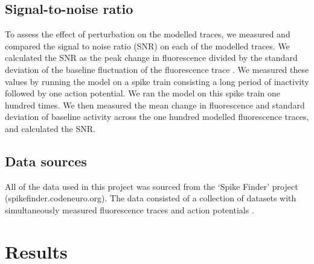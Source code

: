\subsection{Signal-to-noise ratio}\label{sec:snr}
To assess the effect of perturbation on the modelled traces, we measured and compared the signal to noise ratio (SNR) on each of the modelled traces. We calculated the SNR as the peak change in fluorescence divided by the standard deviation of the baseline fluctuation of the fluorescence trace  \parencite{tada}. We measured these values by running the model on a spike train consisting a long period of inactivity followed by one action potential. We ran the model on this spike train one hundred times. We then measured the mean change in fluorescence and standard deviation of baseline activity across the one hundred modelled fluorescence traces, and calculated the SNR.

\subsection{Data sources}
All of the data used in this project was sourced from the ‘Spike Finder’ project \\ (spikefinder.codeneuro.org). The data consisted of a collection of datasets with simultaneously measured fluorescence traces and action potentials  \parencite{berens}.

\section{Results}
